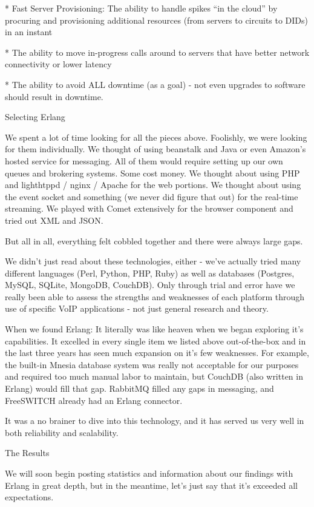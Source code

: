 * Fast Server Provisioning: The ability to handle spikes “in the cloud” by procuring and provisioning additional resources (from servers to circuits to DIDs) in an instant

* The ability to move in-progress calls around to servers that have better network connectivity or lower latency

* The ability to avoid ALL downtime (as a goal) - not even upgrades to software should result in downtime.

Selecting Erlang

We spent a lot of time looking for all the pieces above. Foolishly, we were looking for them individually. We thought of using beanstalk and Java or even Amazon’s hosted service for messaging. All of them would require setting up our own queues and brokering systems. Some cost money. We thought about using PHP and lighthtppd / nginx / Apache for the web portions. We thought about using the event socket and something (we never did figure that out) for the real-time streaming. We played with Comet extensively for the browser component and tried out XML and JSON.

But all in all, everything felt cobbled together and there were always large gaps.

We didn’t just read about these technologies, either - we’ve actually tried many different languages (Perl, Python, PHP, Ruby) as well as databases (Postgres, MySQL, SQLite, MongoDB, CouchDB). Only through trial and error have we really been able to assess the strengths and weaknesses of each platform through use of specific VoIP applications - not just general research and theory.

When we found Erlang: It literally was like heaven when we began exploring it’s capabilities. It excelled in every single item we listed above out-of-the-box and in the last three years has seen much expansion on it’s few weaknesses. For example, the built-in Mnesia database system was really not acceptable for our purposes and required too much manual labor to maintain, but CouchDB (also written in Erlang) would fill that gap. RabbitMQ filled any gaps in messaging, and FreeSWITCH already had an Erlang connector. 

It was a no brainer to dive into this technology, and it has served us very well in both reliability and scalability.

The Results

We will soon begin posting statistics and information about our findings with Erlang in great depth, but in the meantime, let’s just say that it’s exceeded all expectations.  

